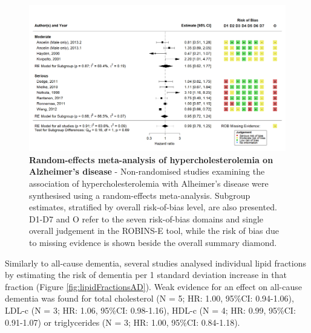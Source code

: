 \documentclass[a4paper, twoside]{templates/ociamthesis}
\begin{document}
\begin{figure}[H]
\includegraphics[width=1\linewidth]{figures/sys-rev/fp_obs_hyperchol_AD} \caption[Random-effects meta-analysis of hypercholesterolemia on Alzheimer's disease]{\textbf{Random-effects meta-analysis of hypercholesterolemia on Alzheimer's disease} - Non-randomised studies examining the association of hypercholesterolemia with Alheimer's disease were synthesised using a random-effects meta-analysis. Subgroup estimates, stratified by overall risk-of-bias level, are also presented. D1-D7 and O refer to the seven risk-of-bias domains and single overall judgement in the ROBINS-E tool, while the risk of bias due to missing evidence is shown beside the overall summary diamond.}\label{fig:obsHyperAD}
\end{figure}

Similarly to all-cause dementia, several studies analysed individual lipid fractions by estimating the risk of dementia per 1 standard deviation increase in that fraction (Figure \ref{fig:lipidFractionsAD}). Weak evidence for an effect on all-cause dementia was found for total cholesterol (N = 5; HR: 1.00, 95\%CI: 0.94-1.06), LDL-c (N = 3; HR: 1.06, 95\%CI: 0.98-1.16), HDL-c (N = 4; HR: 0.99, 95\%CI: 0.91-1.07) or triglycerides (N = 3; HR: 1.00, 95\%CI: 0.84-1.18).

\newpage
\thispagestyle{empty}
\end{document}

